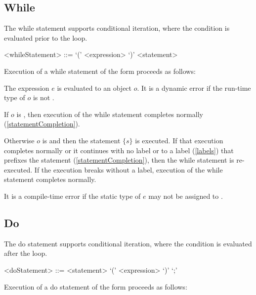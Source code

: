 \documentclass[makeidx]{article}
\begin{document}
{\subsection{While}

\LMHash{}%
The while statement supports conditional iteration,
where the condition is evaluated prior to the loop.

\begin{grammar}
<whileStatement> ::= \WHILE{} `(' <expression> `)' <statement>
\end{grammar}

\LMHash{}%
Execution of a while statement of the form 
proceeds as follows:

\LMHash{}%
The expression $e$ is evaluated to an object $o$.
It is a dynamic error if the run-time type of $o$ is not .

\LMHash{}%
If $o$ is \FALSE, then execution of the while statement completes normally
(\ref{statementCompletion}).

\LMHash{}%
Otherwise $o$ is \TRUE{} and then the statement $\{s\}$ is executed.
If that execution completes normally or it continues with no label
or to a label (\ref{labels}) that prefixes the \WHILE{} statement
(\ref{statementCompletion}),
then the while statement is re-executed.
If the execution breaks without a label,
execution of the while statement completes normally.

\LMHash{}%
It is a compile-time error if
the static type of $e$ may not be assigned to .


\subsection{Do}

\LMHash{}%
The do statement supports conditional iteration,
where the condition is evaluated after the loop.

\begin{grammar}
<doStatement> ::= \DO{} <statement> \WHILE{} `(' <expression> `)' `;'
\end{grammar}

\LMHash{}%
Execution of a do statement of the form 
proceeds as follows:

}
\end{document}
